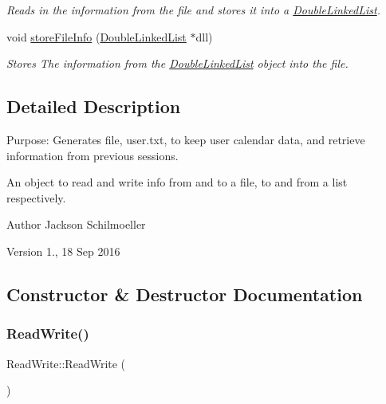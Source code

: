\begin{DoxyCompactItemize}
\begin{DoxyCompactList}\small\item\em Reads in the information from the file and stores it into a \hyperlink{class_double_linked_list}{Double\+Linked\+List}. \end{DoxyCompactList}\item 
void \hyperlink{class_read_write_a323d8e4f3bf72f0ef4726b3c08f0f4c3}{store\+File\+Info} (\hyperlink{class_double_linked_list}{Double\+Linked\+List} $\ast$dll)
\begin{DoxyCompactList}\small\item\em Stores The information from the \hyperlink{class_double_linked_list}{Double\+Linked\+List} object into the file. \end{DoxyCompactList}\end{DoxyCompactItemize}


\subsection{Detailed Description}
Purpose\+: Generates file, user.\+txt, to keep user calendar data, and retrieve information from previous sessions. 

An object to read and write info from and to a file, to and from a list respectively. \begin{DoxyAuthor}{Author}
Jackson Schilmoeller 
\end{DoxyAuthor}
\begin{DoxyVersion}{Version}
1., 18 Sep 2016 
\end{DoxyVersion}


\subsection{Constructor \& Destructor Documentation}
\hypertarget{class_read_write_a11c22591e481ff4fc111e485ab2955c2}{}\label{class_read_write_a11c22591e481ff4fc111e485ab2955c2} 
\subsubsection{\texorpdfstring{Read\+Write()}{ReadWrite()}}
{\footnotesize\ttfamily Read\+Write\+::\+Read\+Write (\begin{DoxyParamCaption}{ }\end{DoxyParamCaption})}



